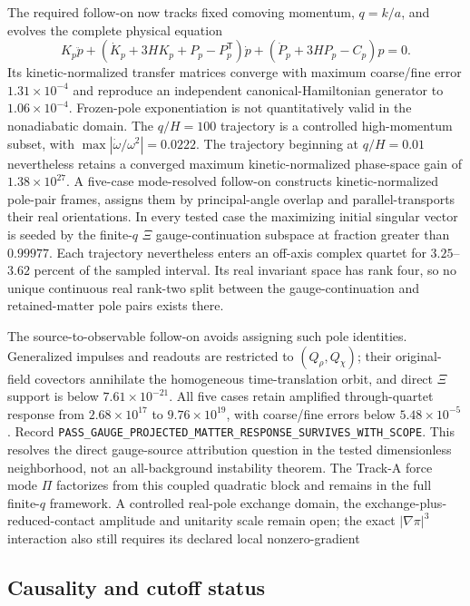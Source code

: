 The required follow-on now tracks fixed comoving momentum, $q=k/a$, and
evolves the complete physical equation
\begin{equation}
 K_p\ddot p+
 \left(\dot K_p+3HK_p+P_p-P_p^{\mathsf T}\right)\dot p+
 \left(\dot P_p+3HP_p-C_p\right)p=0.
 \label{eq:fixed-comoving-transfer}
\end{equation}
Its kinetic-normalized transfer matrices converge with maximum coarse/fine
error $1.31\times10^{-4}$ and reproduce an independent canonical-Hamiltonian
generator to $1.06\times10^{-4}$.  Frozen-pole exponentiation is not
quantitatively valid in the nonadiabatic domain.  The $q/H=100$ trajectory is
a controlled high-momentum subset, with
$\max|\dot\omega/\omega^2|=0.0222$.  The trajectory beginning at $q/H=0.01$
nevertheless retains a converged maximum kinetic-normalized phase-space gain
of $1.38\times10^{27}$.  A five-case mode-resolved follow-on constructs
kinetic-normalized pole-pair frames, assigns them by principal-angle overlap
and parallel-transports their real orientations.  In every tested case the
maximizing initial singular vector is seeded by the finite-$q$ $\Xi$
gauge-continuation subspace at fraction greater than $0.99977$.  Each
trajectory nevertheless enters an off-axis complex quartet for
$3.25$--$3.62$ percent of the sampled interval.  Its real invariant space has
rank four, so no unique continuous real rank-two split between the
gauge-continuation and retained-matter pole pairs exists there.

The source-to-observable follow-on avoids assigning such pole identities.
Generalized impulses and readouts are restricted to $(Q_\rho,Q_\chi)$; their
original-field covectors annihilate the homogeneous time-translation orbit,
and direct $\Xi$ support is below $7.61\times10^{-21}$.  All five cases retain
amplified through-quartet response from $2.68\times10^{17}$ to
$9.76\times10^{19}$, with coarse/fine errors below $5.48\times10^{-5}$.
Record
\texttt{PASS\_GAUGE\_PROJECTED\_MATTER\_RESPONSE\_SURVIVES\_WITH\_SCOPE}.
This resolves the direct gauge-source attribution question in the tested
dimensionless neighborhood, not an all-background instability theorem.  The
Track-A force mode $\Pi$ factorizes from this coupled quadratic block and
remains in the full finite-$q$ framework.  A controlled real-pole exchange
domain, the exchange-plus-reduced-contact amplitude and unitarity scale remain
open; the exact $|\nabla\pi|^3$
interaction also still requires its declared local nonzero-gradient

\subsection{Causality and cutoff status}

